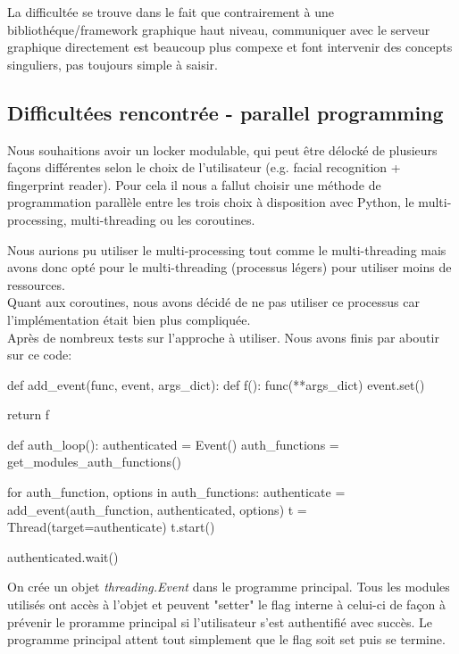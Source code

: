 \documentclass[french]{report}
\begin{document}
La difficultée se trouve dans le fait que contrairement à une bibliothéque/framework
graphique haut niveau, communiquer avec le serveur graphique directement est
beaucoup plus compexe et font intervenir des concepts singuliers, pas toujours
simple à saisir.

\subsection{Difficultées rencontrée - parallel programming}
Nous souhaitions avoir un locker modulable, qui peut être délocké de plusieurs
façons différentes selon le choix de l'utilisateur (e.g. facial recognition
+ fingerprint reader). Pour cela il nous a fallut choisir une méthode de programmation
parallèle entre les trois choix à disposition avec Python, le multi-processing,
multi-threading ou les coroutines.

Nous aurions pu utiliser le multi-processing tout comme le multi-threading mais avons donc
opté pour le multi-threading (processus légers) pour utiliser moins de ressources.\\
Quant aux coroutines, nous avons décidé de ne pas utiliser ce processus car l'implémentation
était bien plus compliquée.
\\
Après de nombreux tests sur l'approche à utiliser. Nous avons finis par aboutir sur ce code:

  \begin{python}
      def add_event(func, event, args_dict):
          def f():
              func(**args_dict)
              event.set()

          return f


      def auth_loop():
          authenticated = Event()
          auth_functions = get_modules_auth_functions()

          for auth_function, options in auth_functions:
              authenticate = add_event(auth_function, authenticated, options)
              t = Thread(target=authenticate)
              t.start()

          authenticated.wait()
    \end{python}

On crée un objet \emph{threading.Event} dans le programme principal. Tous les modules
utilisés ont accès à l'objet et peuvent "setter" le flag interne à celui-ci de façon
à prévenir le proramme principal si l'utilisateur s'est authentifié avec succès.
Le programme principal attent tout simplement que le flag soit set puis se termine.
\end{document}
